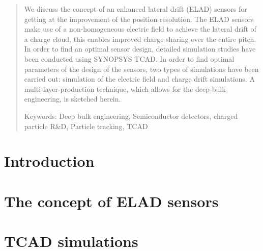 \documentclass[a4paper,10pt]{article}
\newcommand*{\notFOREPJ}{}%
\begin{document}
\begin{abstract}
\noindent
We discuss the concept of an enhanced lateral drift (ELAD) sensors for getting at the improvement of the position resolution. %
The ELAD sensors make use of a non-homogeneous electric field to achieve the lateral drift of a charge cloud, this enables improved charge sharing over the entire pitch. 
In order to find an optimal sensor design, detailed simulation studies have been conducted using SYNOPSYS TCAD.
In order to find optimal parameters of the design of the sensors,  two types of simulations have been carried out: %
 simulation of the electric field and charge drift simulations. 
A multi-layer-production technique, which allows for the deep-bulk engineering, is sketched herein.  

\noindent
Keywords: Deep bulk engineering, Semiconductor detectors, charged particle R\&D, Particle tracking, TCAD %

\end{abstract}


\section{Introduction}
\label{sec:intro}
\ifdefined\notFOREPJ

\else
 
\fi
% 
%  
%  

\section{The concept of ELAD sensors}
\label{sec:concept}
\ifdefined\notFOREPJ

\else
 
\fi

\section{TCAD simulations}
\label{sec:simulations}
\ifdefined\notFOREPJ
 
\else
 
\fi
\end{document}
